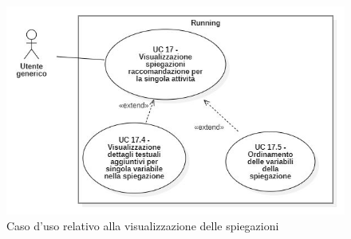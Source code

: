 \begin{figure}[H]
    \centering
    \includegraphics[scale=0.6]{immagini/usecase/cd11.JPG}
    \caption{Caso d'uso relativo alla visualizzazione delle spiegazioni}
\end{figure}

